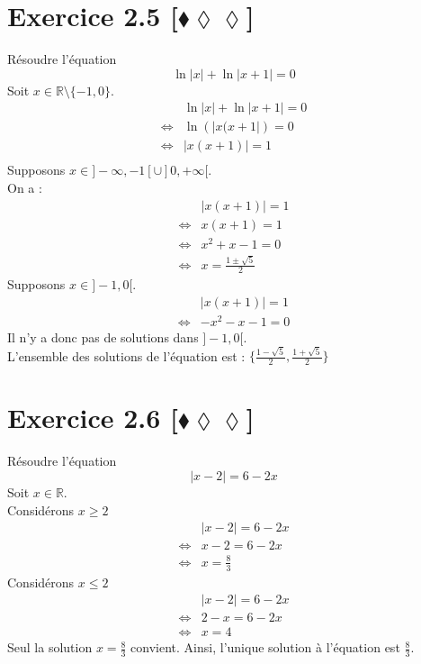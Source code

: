 \documentclass[10pt]{article}
\begin{document}
\section*{Exercice 2.5 [$\blacklozenge\lozenge\lozenge$]}
\begin{tcolorbox}[enhanced, width=7in, center, size=fbox, fontupper=\large, drop shadow southwest]
    Résoudre l'équation
    \begin{equation*}
        \ln|x|+\ln|x+1|=0
    \end{equation*}
    Soit $x\in\mathbb{R}\setminus\{-1,0\}$.
    \begin{align*}
        &\ln|x|+\ln|x+1|=0\\
        \iff&\ln\left(|x(x+1|\right)=0\\
        \iff&|x(x+1)|=1\\
    \end{align*}
    Supposons $x\in]-\infty,-1[\cup]0,+\infty[$.\\
    On a :
    \begin{align*}
        &|x(x+1)|=1\\
        \iff&x(x+1)=1\\
        \iff&x^2+x-1=0\\
        \iff&x=\frac{1\pm\sqrt{5}}{2}
    \end{align*}
    Supposons $x\in]-1,0[$.
    \begin{align*}
        &|x(x+1)|=1\\
        \iff&-x^2-x-1=0
    \end{align*}
    Il n'y a donc pas de solutions dans $]-1,0[$.\\
    L'ensemble des solutions de l'équation est : $\{\frac{1-\sqrt{5}}{2},\frac{1+\sqrt{5}}{2}\}$
\end{tcolorbox}

\section*{Exercice 2.6 [$\blacklozenge\lozenge\lozenge$]}
\begin{tcolorbox}[enhanced, width=7in, center, size=fbox, fontupper=\large, drop shadow southwest]
    Résoudre l'équation
    \begin{equation*}
        |x-2|=6-2x
    \end{equation*}
    Soit $x\in\mathbb{R}$.\\
    Considérons $x\geq2$
    \begin{align*}
        &|x-2|=6-2x\\
        \iff&x-2=6-2x\\
        \iff&x=\frac{8}{3}
    \end{align*}
    Considérons $x\leq2$
    \begin{align*}
        &|x-2|=6-2x\\
        \iff&2-x=6-2x\\
        \iff&x=4
    \end{align*}
    Seul la solution $x=\frac{8}{3}$ convient.
    Ainsi, l'unique solution à l'équation est $\frac{8}{3}$.
\end{tcolorbox}
\end{document}
